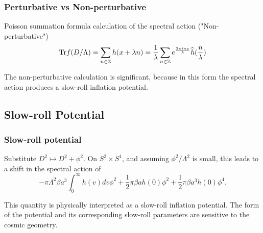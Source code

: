 \documentclass{beamer}
\def\Z{{\mathbb Z}}
\def\Tr{{\rm Tr}}
\begin{document}
\begin{frame}
  \frametitle{Perturbative vs Non-perturbative}
  \begin{block}{Poisson summation formula calculation of the spectral action ("Non-perturbative")}
    \[
      \Tr f (D/\Lambda) = \sum_{n \in \Z} h(x + \lambda n) = \frac{1}{\lambda} \sum_{n \in \Z} e^{\frac{2\pi i n x}{\lambda}}\widehat{h}(\frac{n}{\lambda})
    \]
  \end{block}
  \pause

  \begin{block}{}
	The non-perturbative calculation is significant, because in this form the spectral action produces a slow-roll inflation potential.
  \end{block}
\end{frame}

\subsection{Slow-roll Potential}
\begin{frame}
	\frametitle{Slow-roll potential}
	\begin{block}{}
		Substitute $D^2 \mapsto D^2 + \phi^2$. On $S^3 \times S^1$, and assuming $\phi^2 / \Lambda^2$ is small, this leads to a shift in the spectral action of
		\[
		-\pi \Lambda ^2 \beta a^3 \int_0^{\infty} h(v)dv \phi ^2 + \frac{1}{2} \pi \beta a h(0) \phi^2 + \frac{1}{2} \pi \beta a^3 h(0) \phi^4.
		\]
	\end{block}
	
	\begin{block}{}
		This quantity is physically interpreted as a slow-roll inflation potential.  The form of the potential and its corresponding slow-roll parameters are sensitive to the cosmic geometry.
	\end{block}
\end{frame}
\end{document}
